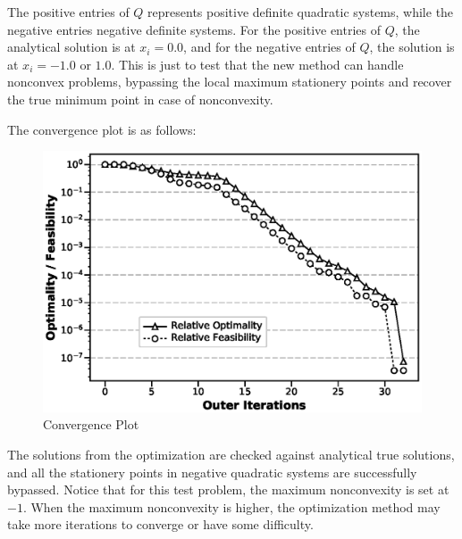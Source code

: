 \documentclass{article}
\theoremstyle{definition}
\begin{document}
The positive entries of $Q$ represents positive definite quadratic systems, while the negative entries negative definite systems. For the positive entries of $Q$, the analytical solution is at $x_i = 0.0$, and for the negative entries of $Q$, the solution is at $x_i = -1.0$ or $1.0$. This is just to test that the new method can handle nonconvex problems, bypassing the local maximum stationery points and recover the true minimum point in case of nonconvexity. 

The convergence plot is as follows:
\begin{figure}[H]
  \centering
  \includegraphics[clip,width=0.6\columnwidth]{./figs/nonconvex_100_1.eps}%
  \caption{Convergence Plot}
  \label{fig:nonconvex}
\end{figure}

The solutions from the optimization are checked against analytical true solutions, and all the stationery points in negative quadratic systems are successfully bypassed. Notice that for this test problem, the maximum nonconvexity is set at $-1$. When the maximum nonconvexity is higher, the optimization method may take more iterations to converge or have some difficulty. 
\end{document}
